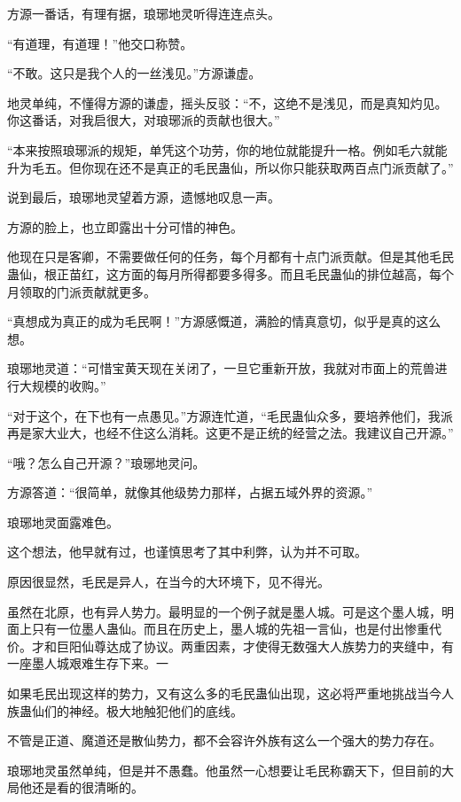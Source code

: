 
\begin{this_body}

方源一番话，有理有据，琅琊地灵听得连连点头。

“有道理，有道理！”他交口称赞。

“不敢。这只是我个人的一丝浅见。”方源谦虚。

地灵单纯，不懂得方源的谦虚，摇头反驳：“不，这绝不是浅见，而是真知灼见。你这番话，对我启很大，对琅琊派的贡献也很大。”

“本来按照琅琊派的规矩，单凭这个功劳，你的地位就能提升一格。例如毛六就能升为毛五。但你现在还不是真正的毛民蛊仙，所以你只能获取两百点门派贡献了。”

说到最后，琅琊地灵望着方源，遗憾地叹息一声。

方源的脸上，也立即露出十分可惜的神色。

他现在只是客卿，不需要做任何的任务，每个月都有十点门派贡献。但是其他毛民蛊仙，根正苗红，这方面的每月所得都要多得多。而且毛民蛊仙的排位越高，每个月领取的门派贡献就更多。

“真想成为真正的成为毛民啊！”方源感慨道，满脸的情真意切，似乎是真的这么想。

琅琊地灵道：“可惜宝黄天现在关闭了，一旦它重新开放，我就对市面上的荒兽进行大规模的收购。”

“对于这个，在下也有一点愚见。”方源连忙道，“毛民蛊仙众多，要培养他们，我派再是家大业大，也经不住这么消耗。这更不是正统的经营之法。我建议自己开源。”

“哦？怎么自己开源？”琅琊地灵问。

方源答道：“很简单，就像其他级势力那样，占据五域外界的资源。”

琅琊地灵面露难色。

这个想法，他早就有过，也谨慎思考了其中利弊，认为并不可取。

原因很显然，毛民是异人，在当今的大环境下，见不得光。

虽然在北原，也有异人势力。最明显的一个例子就是墨人城。可是这个墨人城，明面上只有一位墨人蛊仙。而且在历史上，墨人城的先祖一言仙，也是付出惨重代价。才和巨阳仙尊达成了协议。两重因素，才使得无数强大人族势力的夹缝中，有一座墨人城艰难生存下来。一

如果毛民出现这样的势力，又有这么多的毛民蛊仙出现，这必将严重地挑战当今人族蛊仙们的神经。极大地触犯他们的底线。

不管是正道、魔道还是散仙势力，都不会容许外族有这么一个强大的势力存在。

琅琊地灵虽然单纯，但是并不愚蠢。他虽然一心想要让毛民称霸天下，但目前的大局他还是看的很清晰的。


\end{this_body}
